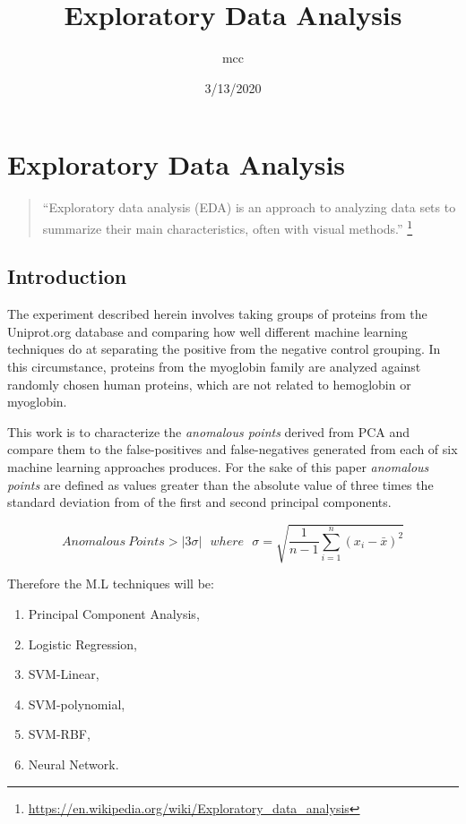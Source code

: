 \documentclass[]{article}
\title{Exploratory Data Analysis}
\author{mcc}
\date{3/13/2020}
\providecommand{\tightlist}{%
  \setlength{\itemsep}{0pt}\setlength{\parskip}{0pt}}
\begin{document}
\maketitle

\hypertarget{exploratory-data-analysis}{%
\section{Exploratory Data Analysis}\label{exploratory-data-analysis}}

\begin{quote}
``Exploratory data analysis (EDA) is an approach to analyzing data sets
to summarize their main characteristics, often with visual methods.''
\footnote{\url{https://en.wikipedia.org/wiki/Exploratory_data_analysis}}
\end{quote}

\hypertarget{introduction}{%
\subsection{Introduction}\label{introduction}}

The experiment described herein involves taking groups of proteins from
the Uniprot.org database and comparing how well different machine
learning techniques do at separating the positive from the negative
control grouping. In this circumstance, proteins from the myoglobin
family are analyzed against randomly chosen human proteins, which are
not related to hemoglobin or myoglobin.

This work is to characterize the \emph{anomalous points} derived from
PCA and compare them to the false-positives and false-negatives
generated from each of six machine learning approaches produces. For the
sake of this paper \emph{anomalous points} are defined as values greater
than the absolute value of three times the standard deviation from of
the first and second principal components.

\begin{equation}
Anomalous ~Points > | 3 \sigma | ~~~where~~~ \sigma = \sqrt{ \frac{1}{n-1} \sum^n_{i=1} (x_i - \bar x)^2}
\end{equation}

Therefore the M.L techniques will be:

\begin{enumerate}
\def\labelenumi{\arabic{enumi}.}
\tightlist
\item
  Principal Component Analysis,
\item
  Logistic Regression,
\item
  SVM-Linear,
\item
  SVM-polynomial,
\item
  SVM-RBF,
\item
  Neural Network.
\end{enumerate}
\end{document}
